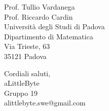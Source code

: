 \documentclass[a4paper,11pt]{letter}
\makeatletter
\newcommand{\GruppoFirma}{aLittleByte\\Gruppo 19\\alittlebyte.swe@gmail.com}
\makeatother
\begin{document}
\begin{letter}{Prof. Tullio Vardanega\\Prof. Riccardo Cardin\\Università degli Studi di Padova\\Dipartimento di Matematica\\Via Trieste, 63\\35121 Padova}
  \vspace{0.8em}

  \closing{Cordiali saluti, \vspace{1.2em} \\ \GruppoFirma}

  \end{letter}

  
\end{document}
